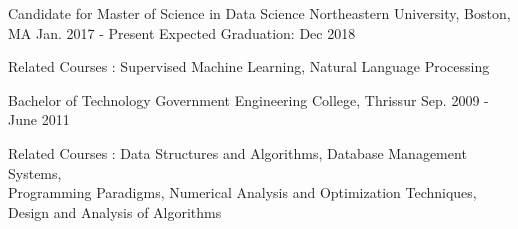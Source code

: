 \vspace{0.5cm}
\begin{cventries}
  \cventry
    {Candidate for Master of Science in Data Science}
    {Northeastern University, Boston, MA}
    {Jan. 2017 - Present}
    {Expected Graduation: Dec 2018 }
    {
      \begin{cvitems}
      \item {Related Courses : Supervised Machine Learning, Natural Language Processing}
      \end{cvitems}
    }
      \cventry
    {Bachelor of Technology}
    {Government Engineering College, Thrissur}
    {Sep. 2009 - June 2011}
    {}
    {
      \begin{cvitems}
      \item {Related Courses : Data Structures and Algorithms, Database Management Systems, \\
          Programming Paradigms, Numerical Analysis and Optimization Techniques, \\
          Design and Analysis of Algorithms}
      \end{cvitems}
    }
\end{cventries}

